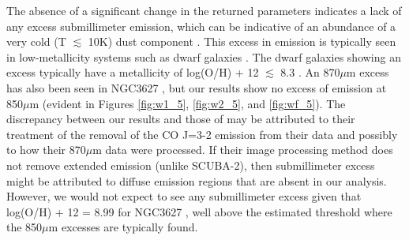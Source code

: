 The absence of a significant change in the returned parameters indicates a lack of any excess submillimeter emission, which can be indicative of an abundance of a very cold (T $\lesssim$ 10K) dust component \citep{dale2012}.  This excess in emission is typically seen in low-metallicity systems such as dwarf galaxies \citep{madden2011}.  The dwarf galaxies showing an excess typically have a metallicity of log(O/H) + 12 $\lesssim$ 8.3 \citep{remy2013}. An 870$\mu$m excess has also been seen in NGC3627 \citep{galametz2014}, but our results show no excess of emission at 850$\mu$m (evident in Figures \ref{fig:w1_5}, \ref{fig:w2_5}, and \ref{fig:wf_5}).  The discrepancy between our results and those of \cite{galametz2014} may be attributed to their treatment of the removal of the CO J=3-2 emission from their data and possibly to how their 870$\mu$m data were processed.  If their image processing method does not remove extended emission (unlike SCUBA-2), then submillimeter excess might be attributed to diffuse emission regions that are absent in our analysis.  However, we would not expect to see any submillimeter excess given that log(O/H) + 12 = 8.99 for NGC3627 \citep{moustakas2010}, well above the estimated threshold where the 850$\mu$m excesses are typically found.




